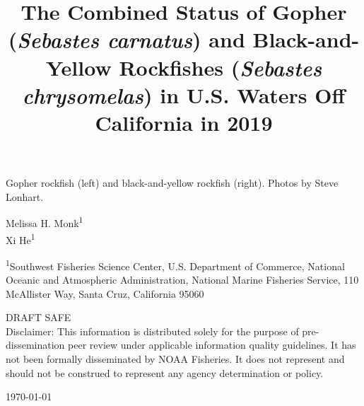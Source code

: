 \documentclass[12pt,]{article}
\title{The Combined Status of Gopher (\emph{Sebastes carnatus}) and
Black-and-Yellow Rockfishes (\emph{Sebastes chrysomelas}) in U.S. Waters
Off California in 2019}
\author{}
\date{}
\begin{document}
\maketitle


\begin{center}
\thispagestyle{empty}


\vspace{.5cm}

Gopher rockfish (left) and black-and-yellow rockfish (right).      
\small
Photos by Steve Lonhart.

\vspace{.3cm}


Melissa H. Monk\textsuperscript{1}\\
Xi He\textsuperscript{1}\\

\vspace{.5cm}

\small
\textsuperscript{1}Southwest Fisheries Science Center, U.S. Department of Commerce, National Oceanic and Atmospheric Administration, National Marine Fisheries Service, 110 McAllister Way, Santa Cruz, California 95060\\

\vspace{1.5cm}


DRAFT SAFE\\
Disclaimer: This information is distributed solely for the purpose of pre-dissemination
peer review under applicable information quality guidelines. It has not been formally
disseminated by NOAA Fisheries. It does not represent and should not be construed to
represent any agency determination or policy. 

\vspace{.1cm}
{\large \today}


\newpage{\thispagestyle{empty}}


\begin{flushleft}

\end{flushleft}

\maketitle

\setcounter{page}{1}
\end{center}
\end{document}
